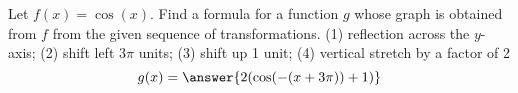 \documentclass{ximera}
\author{Kenneth Berglund}
\begin{document}
\begin{exercise}
Let $f(x) = \cos(x)$. Find a formula for a function $g$ whose graph is obtained from $f$ from the given
sequence of transformations.
(1) reflection across the $y$-axis; (2) shift left $3\pi$ units; (3) shift up 1 unit; (4) vertical stretch by a factor of 2
\[
g(x)=\answer{2(\cos(-(x + 3\pi)) + 1)}
\]
\end{exercise}
\end{document}
